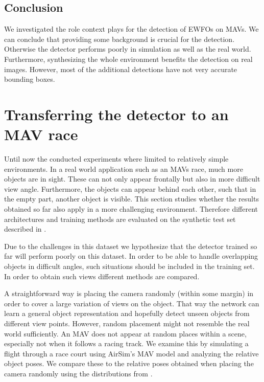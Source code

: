 \subsection{Conclusion}

We investigated the role context plays for the detection of \acp{EWFO} on \acp{MAV}. We can conclude that providing some background is crucial for the detection. Otherwise the detector performs poorly in simulation as well as the real world. Furthermore, synthesizing the whole environment benefits the detection on real images. However, most of the additional detections have not very accurate bounding boxes.

\section{Transferring the detector to an \ac{MAV} race}

Until now the conducted experiments where limited to relatively simple environments. In a real world application such as an \acp{MAV} race, much more objects are in sight. These can not only appear frontally but also in more difficult view angle. Furthermore, the objects can appear behind each other, such that in the empty part, another object is visible. This section studies whether the results obtained so far also apply in a more challenging environment. Therefore different architectures and training methods are evaluated on the synthetic test set described in .

Due to the challenges in this dataset we hypothesize that the detector trained so far will perform poorly on this dataset. In order to be able to handle overlapping objects in difficult angles, such situations should be included in the training set. In order to obtain such views different methods are compared.

A straightforward way is placing the camera randomly (within some margin) in order to cover a large variation of views on the object. That way the network can learn a general object representation and hopefully detect unseen objects from different view points. However, random  placement might not resemble the real world sufficiently. An \ac{MAV} does not appear at random places within a scene, especially not when it follows a racing track. We examine this by simulating a flight through a race court using AirSim's \ac{MAV} model and analyzing the relative object poses. We compare these to the relative poses obtained when placing the camera randomly using the distributions from .

